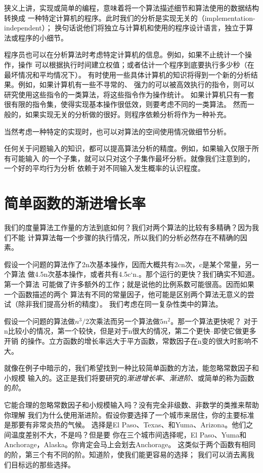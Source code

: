 狭义上讲，实现或简单的编程，意味着将一个算法描述细节和算法使用的数据结构转换成
一种特定计算机的程序。此时我们的分析是实现无关的（implementation-independent）；
换句话说他们将独立与计算机和使用的程序设计语言，独立于算法或程序的小细节。

程序员也可以在分析算法时考虑特定计算机的信息。例如，如果不止统计一个操作，操作
可以根据执行时间建立权值；或者估计一个程序到底要执行多少秒（在最坏情况和平均情况下）。
有时使用一些具体计算机的知识将得到一个新的分析结果。例如，如果计算机有一些不寻常的、
强力的可以被高效执行的指令，则可以研究使用这些指令的一类算法，将这些指令作为操作统计。
如果计算机只有一套很有限的指令集，使得实现基本操作很低效，则要考虑不同的一类算法。
然而一般的，如果实现无关的分析做的很好。则程序依赖分析将作为一种补充。

当然考虑一种特定的实现时，也可以对算法的空间使用情况做细节分析。

任何关于问题输入的知识，都可以提高算法分析的精度。例如，如果输入仅限于所有可能输入
的一个子集，就可以只对这个子集作最坏分析。就像我们注意到的，一个好的平均行为分析
依赖于对不同输入发生概率的认识程度。


\section{简单函数的渐进增长率}\label{Sec:AsymptoticGrowthRate}
我们的度量算法工作量的方法到底如何？我们对两个算法的比较有多精确？因为我们不能
计算算法每一个步骤的执行情况，所以我们的分析必然存在不精确的因素。

假设一个问题的算法作了2n次基本操作，因而大概共有2cn次，c是某个常量，另一个算法
做4.5n次基本操作，或者共有4.5c`n.。那个运行的更快？我们确实不知道。第一个算法
可能做了许多额外的工作；就是说他的比例系数可能很高。因而如果一个函数描述的两个
算法有不同的常量因子，他可能是区别两个算法无意义的尝试（除非我们提高分析的精度）。
我们考虑在同一复杂性类中的算法。


假设一个问题的算法做$n^3/2$次乘法而另一个算法做$5n^2$。那一个算法更快呢？
对于n比较小的情况，第一个较快，但是对于n很大的情况，第二个更快--即使它做更多开销
的操作。立方函数的增长率远大于平方函数，常数因子在n变的很大时影响不大。

就像在例子中暗示的，我们希望找到一种比较简单函数的方法，能忽略常数因子和小规模
输入的。这正是我们将要研究的\emph{渐进增长率}、\emph{渐进阶}、或简单的称为函数的\emph{阶}。

它能合理的忽略常数因子和小规模输入吗？没有完全非级数、非数学的类推来帮助你理解
我们为什么使用渐进阶。假设你要选择了一个城市来居住，你的主要标准是那要有非常炎热的气候。
选择是El Paso、Texas、和Yuma、Arizona。他们之间温度差别不大，不是吗？但是要
你在三个城市间选择呢，El Paso、Yuma和Anchorage，Alaska。你肯定会马上会划去Anchorage。
这类似于两个函数有相同的阶，第三个有不同的阶。知道阶，使我们能更容易的选择；
我们可以消去离我们目标远的那些选择。

